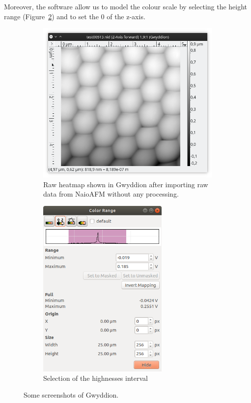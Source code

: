 \documentclass[11pt,a4paper]{article}
\begin{document}
Moreover, the software allow us to model the colour scale by selecting the height range (Figure~\ref{fig:scale_selection}) and to set the 0 of the z-axis.

\begin{figure}[ht]
\centering
\begin{subfigure}[b]{0.45\textwidth}
\includegraphics[width=\textwidth]{heatmap_rawdata}
\caption{Raw heatmap shown in Gwyddion after importing raw data from NaioAFM without any processing.}
\label{fig:heatmap_rawdata}
\end{subfigure}
\begin{subfigure}[b]{0.45\textwidth}
\centering
\includegraphics[width=0.7\textwidth]{scale_selection}
\caption{Selection of the highnesses interval}
\label{fig:scale_selection}
\end{subfigure}
\caption{Some screenshots of Gwyddion.}
\label{fig:gwyddion}
\end{figure}
\end{document}
